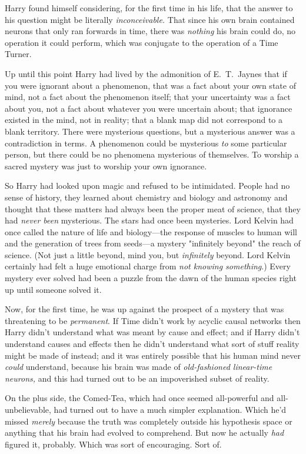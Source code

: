 Harry found himself considering, for the first time in his life, that the
answer to his question might be literally \emph{inconceivable.} That since his
own brain contained neurons that only ran forwards in time, there was
\emph{nothing} his brain could do, no operation it could perform, which was
conjugate to the operation of a Time Turner.

Up until this point Harry had lived by the admonition of E.~T.~Jaynes that if
you were ignorant about a phenomenon, that was a fact about your own state of
mind, not a fact about the phenomenon itself; that your uncertainty was a fact
about you, not a fact about whatever you were uncertain about; that ignorance
existed in the mind, not in reality; that a blank map did not correspond to a
blank territory. There were mysterious questions, but a mysterious answer was a
contradiction in terms. A phenomenon could be mysterious \emph{to} some
particular person, but there could be no phenomena mysterious of themselves. To
worship a sacred mystery was just to worship your own ignorance.

So Harry had looked upon magic and refused to be intimidated. People had no
sense of history, they learned about chemistry and biology and astronomy and
thought that these matters had always been the proper meat of science, that
they had \emph{never been} mysterious. The stars had once been mysteries. Lord
Kelvin had once called the nature of life and biology—the response of muscles
to human will and the generation of trees from seeds—a mystery "infinitely
beyond" the reach of science. (Not just a little beyond, mind you, but
\emph{infinitely} beyond. Lord Kelvin certainly had felt a huge emotional
charge from \emph{not knowing something}.) Every mystery ever solved had been a
puzzle from the dawn of the human species right up until someone solved it.

Now, for the first time, he was up against the prospect of a mystery that was
threatening to be \emph{permanent}. If Time didn't work by acyclic causal
networks then Harry didn't understand what was meant by cause and effect; and
if Harry didn't understand causes and effects then he didn't understand what
sort of stuff reality might be made of instead; and it was entirely possible
that his human mind never \emph{could} understand, because his brain was made
of \emph{old-fashioned linear-time neurons,} and this had turned out to be an
impoverished subset of reality.

On the plus side, the Comed-Tea, which had once seemed all-powerful and
all-unbelievable, had turned out to have a much simpler explanation. Which he'd
missed \emph{merely} because the truth was completely outside his hypothesis
space or anything that his brain had evolved to comprehend. But now he actually
\emph{had} figured it, probably. Which was sort of encouraging. Sort of.

